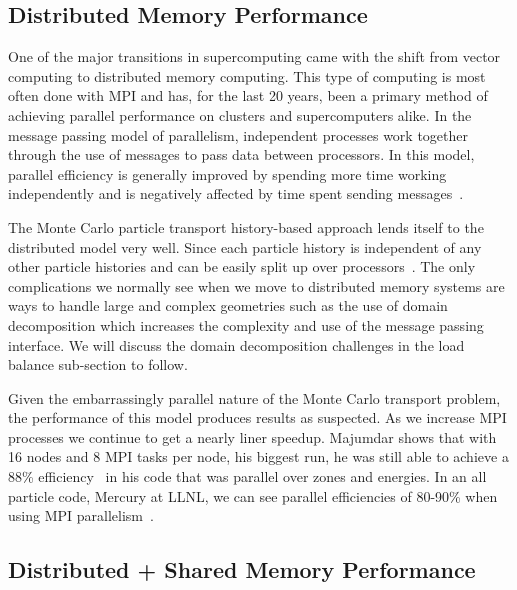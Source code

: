 \subsection*{ \textbf{Distributed Memory Performance}}

One of the major transitions in supercomputing came with the shift from vector computing to distributed memory computing.
%
This type of computing is most often done with MPI and has, for the last 20 years, been a primary method of achieving parallel performance on clusters and supercomputers alike.
%
In the message passing model of parallelism, independent processes work together through the use of messages to pass data between processors.
%
In this model, parallel efficiency is generally improved by spending more time working independently and is negatively affected by time spent sending messages~\cite{yanghybrid}.
%

%
The Monte Carlo particle transport history-based approach lends itself to the distributed model very well.
%
Since each particle history is independent of any other particle histories and can be easily split up over processors~\cite{yanghybrid}.
%
The only complications we normally see when we move to distributed memory systems are ways to handle large and complex geometries such as the use of domain decomposition which increases the complexity and use of the message passing interface.
%
We will discuss the domain decomposition challenges in the load balance sub-section to follow.
%

%
Given the embarrassingly parallel nature of the Monte Carlo transport problem, the performance of this model produces results as suspected.
%
As we increase MPI processes we continue to get a nearly liner speedup.
%
Majumdar shows that with 16 nodes and 8 MPI tasks per node, his biggest run, he was still able to achieve a 88\% efficiency~\cite{majumdar2000parallel} in his code that was parallel over zones and energies.
%
In an all particle code, Mercury at LLNL, we can see parallel efficiencies of 80-90\% when using MPI parallelism~\cite{procassini2005load}.

\subsection*{ \textbf{Distributed + Shared Memory Performance}}

